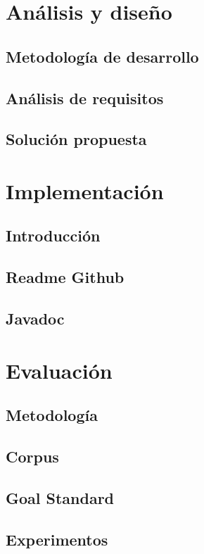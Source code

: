 \documentclass[14pt]{extarticle}
\theoremstyle{definition}
\theoremstyle{remark}
\begin{document}
\section{Análisis y diseño}\label{sec:analisisydiseno}
\subsection{Metodología de desarrollo}\label{sec:metodologiadedesarrollo}
\subsection{Análisis de requisitos}\label{sec:analisisderequisitos}
\subsection{Solución propuesta}\label{sec:solucionpropuesta}
\section{Implementación}\label{sec:implementacion}
\subsection{Introducción}\label{sec:introduccion}
\subsection{Readme Github}\label{sec:readmegithub}
\subsection{Javadoc}\label{sec:javadoc}
\section{Evaluación}\label{sec:evaluacion}
\subsection{Metodología}\label{sec:metodologia}
\subsection{Corpus}\label{sec:corpus}
\subsection{Goal Standard}\label{sec:goalstandard}
\subsection{Experimentos}\label{sec:experimentos}
\end{document}

